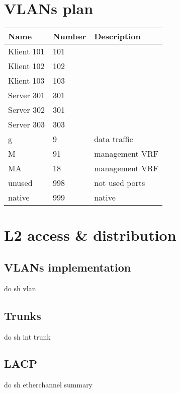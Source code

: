 \documentclass[czech,master,dept460,male,cpp,cpdeclaration]{diploma}
\begin{document}
\MakeTitlePages

\section{VLANs plan}
\label{sec:Sec01}
\begin{tabular}{l|l|l}
	Name & Number & Description \\
	\hline
	Klient 101 & 101 & \\
	Klient 102 & 102 & \\
	Klient 103 & 103 & \\
	Server 301 & 301 & \\
	Server 302 & 301 & \\
	Server 303 & 303 & \\
	g & 9 & data traffic\\
	M & 91 & management VRF\\
	MA & 18 & management VRF\\
	unused & 998 & not used ports \\
	native & 999 & native \\
\end{tabular}

\newpage
\section{L2 access \& distribution}
\label{sec:Sec02}

\subsection{VLANs implementation}
\label{subsec:Sec021}
\noindent do sh vlan

\subsection{Trunks}
\label{subsec:Sec022}
\noindent do sh int trunk

\subsection{LACP}
\label{subsec:Sec023}
\noindent do sh etherchannel summary
\end{document}
